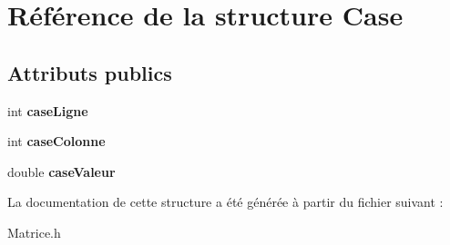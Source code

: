 \hypertarget{structCase}{\section{Référence de la structure Case}
\label{structCase}
}
\subsection*{Attributs publics}
\begin{DoxyCompactItemize}
\item 
\hypertarget{structCase_a8ba07d21dac8f757b3716bf6aed3e602}{int {\bfseries case\-Ligne}}\label{structCase_a8ba07d21dac8f757b3716bf6aed3e602}

\item 
\hypertarget{structCase_ae426d726d737d7eea3877c0686ebe654}{int {\bfseries case\-Colonne}}\label{structCase_ae426d726d737d7eea3877c0686ebe654}

\item 
\hypertarget{structCase_a646252a1aa4c2186ba20ebf5ea76aa7f}{double {\bfseries case\-Valeur}}\label{structCase_a646252a1aa4c2186ba20ebf5ea76aa7f}

\end{DoxyCompactItemize}


La documentation de cette structure a été générée à partir du fichier suivant \-:\begin{DoxyCompactItemize}
\item 
Matrice.\-h\end{DoxyCompactItemize}
